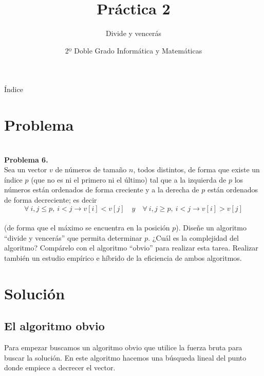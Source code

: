 \documentclass[compress]{beamer}
\title{Práctica 2}                                               %
\subtitle{Divide y vencerás}                                  %
\author{}
\date{2º Doble Grado Informática y Matemáticas}                                                            %
\begin{document}
\begin{frame}
\titlepage
\end{frame}

\begin{frame}{Índice}
  \hypertarget{index}{}
  \tableofcontents
  
\end{frame}

\section{Problema}
\begin{frame}

\textbf{\\Problema 6.\\}
		Sea un vector $v$ de números de tamaño $n$, todos distintos, de forma que existe un índice $p$ (que no es ni el primero ni el último) tal que a la izquierda de $p$ los números están ordenados de forma creciente y a la derecha de $p$ están ordenados de forma decreciente; es decir%
$$\forall \ i,j \leq p , \ i < j \rightarrow v[i] < v[j] \quad y \quad \forall \ i,j \geq p, \ i < j \rightarrow v[i]>v[j]$$\\
(de forma que el máximo se encuentra en la posición $p$). Diseñe un algoritmo ``divide y vencerás'' que permita determinar $p$. ¿Cuál es la complejidad del algoritmo? Compárelo con el algoritmo ``obvio'' para realizar esta tarea. Realizar también un estudio empírico e híbrido de la eficiencia de ambos algoritmos.

\end{frame}	
	
\section{Solución}

\subsection{El algoritmo obvio}

\begin{frame}
	Para empezar buscamos un algoritmo obvio que utilice la fuerza bruta para buscar la solución. En este algoritmo hacemos una búsqueda lineal del punto donde empiece a decrecer el vector.
\end{frame}
\end{document}
